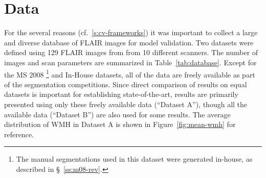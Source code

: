\section{Data}\label{s:data}
For the several reasons (cf.~\ref{s:cv-frameworks})
it was important to collect a large and diverse database of FLAIR images for model validation.
Two datasets were defined using 129 FLAIR images from from 10 different scanners.
The number of images and scan parameters are summarized in Table~\ref{tab:database}.
Except for the MS 2008%
\footnote{The manual segmentations used in this dataset were generated in-house,
  as described in \S~\ref{ss:m08-rev}.}
and In-House datasets,
all of the data are freely available as part of the segmentation competitions.
Since direct comparison of results on equal datasets is important for establishing state-of-the-art, 
results are primarily presented using only these freely available data (``Dataset A''),
though all the available data (``Dataset B'') are also used for some results.
The average distribution of WMH in Dataset A is shown in Figure~\ref{fig:mean-wmh} for reference.
\par

